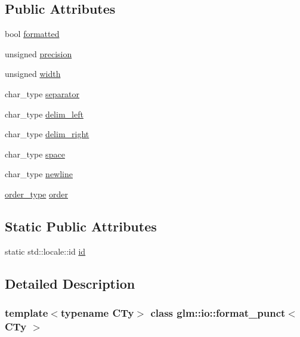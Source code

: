 \subsection*{Public Attributes}
\begin{DoxyCompactItemize}
\item 
bool \hyperlink{classglm_1_1io_1_1format__punct_ab28088e6eef03fe4222fa8a5dd95288e}{formatted}
\item 
unsigned \hyperlink{classglm_1_1io_1_1format__punct_a5a15d396b7c963df9dec5e124236dc02}{precision}
\item 
unsigned \hyperlink{classglm_1_1io_1_1format__punct_a95d32ca2330bbf7c50d3e066b7a851db}{width}
\item 
char\+\_\+type \hyperlink{classglm_1_1io_1_1format__punct_ac561eb04fc2a1282ef38ea15f8e640ee}{separator}
\item 
char\+\_\+type \hyperlink{classglm_1_1io_1_1format__punct_ab1beed331269a39b06d17d02cf727d7c}{delim\+\_\+left}
\item 
char\+\_\+type \hyperlink{classglm_1_1io_1_1format__punct_a62fb1280404360463ec5af7144aa0949}{delim\+\_\+right}
\item 
char\+\_\+type \hyperlink{classglm_1_1io_1_1format__punct_adf9a915938727793de1daca07dcdfa4e}{space}
\item 
char\+\_\+type \hyperlink{classglm_1_1io_1_1format__punct_a8ddf8abdb0ebbdbb7eca08d7a777956e}{newline}
\item 
\hyperlink{namespaceglm_1_1io_a3497781803fe594a37177e05ab2a795f}{order\+\_\+type} \hyperlink{classglm_1_1io_1_1format__punct_a9de1f3b7120a036ec0ab394d2036d0aa}{order}
\end{DoxyCompactItemize}
\subsection*{Static Public Attributes}
\begin{DoxyCompactItemize}
\item 
static std\+::locale\+::id \hyperlink{classglm_1_1io_1_1format__punct_a763f60aeaecec9290917ed1d83b79838}{id}
\end{DoxyCompactItemize}


\subsection{Detailed Description}
\subsubsection*{template$<$typename C\+Ty$>$\newline
class glm\+::io\+::format\+\_\+punct$<$ C\+Ty $>$}



